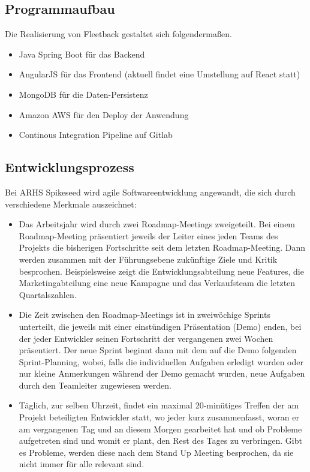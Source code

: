 \documentclass[a4paper, 11pt]{article}
\begin{document}
\subsection{Programmaufbau}
Die Realisierung von Fleetback gestaltet sich folgendermaßen.
\begin{itemize}
    \item Java Spring Boot für das Backend
    \item AngularJS für das Frontend (aktuell findet eine Umstellung auf React statt)
    \item MongoDB für die Daten-Persistenz
    \item Amazon AWS für den Deploy der Anwendung
    \item Continous Integration Pipeline auf Gitlab 
\end{itemize}

\subsection{Entwicklungsprozess}
Bei ARHS Spikeseed wird agile Softwareentwicklung angewandt, die sich durch verschiedene Merkmale auszeichnet:
\begin{itemize}
    \item Das Arbeitsjahr wird durch zwei Roadmap-Meetings zweigeteilt. Bei einem Roadmap-Meeting präsentiert jeweils der Leiter eines jeden Teams des Projekts die bisherigen Fortschritte seit dem letzten Roadmap-Meeting. Dann werden zusammen mit der Führungsebene zukünftige Ziele und Kritik besprochen. Beispielsweise zeigt die Entwicklungsabteilung neue Features, die Marketingabteilung eine neue Kampagne und das Verkaufsteam die letzten Quartalszahlen.
    \item Die Zeit zwischen den Roadmap-Meetings ist in zweiwöchige Sprints unterteilt, die jeweils mit einer einstündigen Präsentation (Demo) enden, bei der jeder Entwickler seinen Fortschritt der vergangenen zwei Wochen präsentiert. Der neue Sprint beginnt dann mit dem auf die Demo folgenden Sprint-Planning, wobei, falls die individuellen Aufgaben erledigt wurden oder nur kleine Anmerkungen während der Demo gemacht wurden, neue Aufgaben durch den Teamleiter zugewiesen werden.
    \item Täglich, zur selben Uhrzeit, findet ein maximal 20-minütiges Treffen der am Projekt beteiligten Entwickler statt, wo jeder kurz zusammenfasst, woran er am vergangenen Tag und an diesem Morgen gearbeitet hat und ob Probleme aufgetreten sind und womit er plant, den Rest des Tages zu verbringen. Gibt es Probleme, werden diese nach dem Stand Up Meeting besprochen, da sie nicht immer für alle relevant sind.

\end{itemize}
\end{document}

